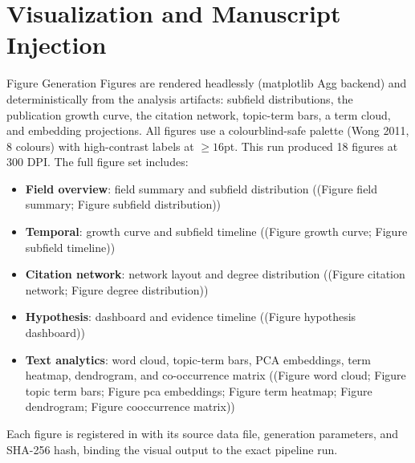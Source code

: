 \documentclass[
  ignorenonframetext,
]{beamer}
\author{\texorpdfstring{}{}}
\date{}
\providecommand{\tightlist}{%
  \setlength{\itemsep}{0pt}\setlength{\parskip}{0pt}}
\begin{document}
\section{Visualization and Manuscript
Injection}\label{visualization-and-manuscript-injection}

\begin{frame}{Figure Generation}
\protect{}\label{figure-generation}
Figures are rendered headlessly (matplotlib Agg backend) and
deterministically from the analysis artifacts: subfield distributions,
the publication growth curve, the citation network, topic-term bars, a
term cloud, and embedding projections. All figures use a
colourblind-safe palette (Wong 2011, 8 colours) with high-contrast
labels at \(\geq 16\)pt. This run produced 18 figures at 300 DPI. The
full figure set includes:

\begin{itemize}
\tightlist
\item
  \textbf{Field overview}: field summary and subfield distribution
  ((Figure field summary; Figure subfield distribution))
\item
  \textbf{Temporal}: growth curve and subfield timeline ((Figure growth
  curve; Figure subfield timeline))
\item
  \textbf{Citation network}: network layout and degree distribution
  ((Figure citation network; Figure degree distribution))
\item
  \textbf{Hypothesis}: dashboard and evidence timeline ((Figure
  hypothesis dashboard))
\item
  \textbf{Text analytics}: word cloud, topic-term bars, PCA embeddings,
  term heatmap, dendrogram, and co-occurrence matrix ((Figure word
  cloud; Figure topic term bars; Figure pca embeddings; Figure term
  heatmap; Figure dendrogram; Figure cooccurrence matrix))
\end{itemize}

Each figure is registered in  with its
source data file, generation parameters, and SHA-256 hash, binding the
visual output to the exact pipeline run.
\end{frame}
\end{document}
